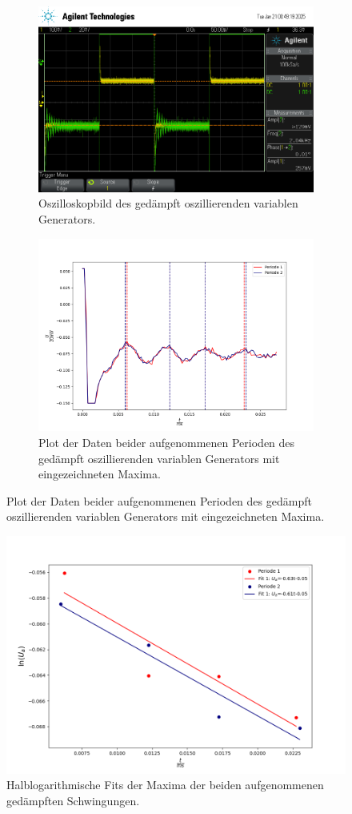 \begin{figure}
    \centering
    \begin{subfigure}{\textwidth}
        \centering
        \includegraphics[width=0.7\linewidth]{data/scope_14.png}
        \caption{Oszilloskopbild des gedämpft oszillierenden variablen Generators.}
        \label{fig:generator_gedampft}
    \end{subfigure}
    \begin{subfigure}{\textwidth}
        \centering
        \includegraphics[width=0.85\linewidth]{figures/generator_dampened.png}
        \caption{Plot der Daten beider aufgenommenen Perioden des gedämpft oszillierenden variablen Generators mit eingezeichneten Maxima.}
        \label{fig:generator_gedampft_plot}
    \end{subfigure}
\end{figure}

\begin{figure}
    \centering
    \includegraphics[width=0.85\linewidth]{figures/generator_dampened_fit.png}
    \caption{Halblogarithmische Fits der Maxima der beiden aufgenommenen gedämpften Schwingungen.}
    \label{fig:generator_fits}
\end{figure}